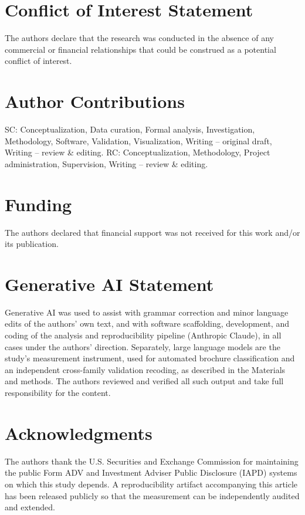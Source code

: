 \documentclass[utf8]{FrontiersinHarvard}
\begin{document}
\section*{Conflict of Interest Statement}
The authors declare that the research was conducted in the absence of any commercial or financial relationships that could be construed as a potential conflict of interest.

\section*{Author Contributions}
SC: Conceptualization, Data curation, Formal analysis, Investigation, Methodology, Software, Validation, Visualization, Writing -- original draft, Writing -- review \& editing. RC: Conceptualization, Methodology, Project administration, Supervision, Writing -- review \& editing.

\section*{Funding}
The authors declared that financial support was not received for this work and/or its publication.

\section*{Generative AI Statement}
Generative AI was used to assist with grammar correction and minor language edits of the authors' own text, and with software scaffolding, development, and coding of the analysis and reproducibility pipeline (Anthropic Claude), in all cases under the authors' direction. Separately, large language models are the study's measurement instrument, used for automated brochure classification and an independent cross-family validation recoding, as described in the Materials and methods. The authors reviewed and verified all such output and take full responsibility for the content.

\section*{Acknowledgments}
The authors thank the U.S. Securities and Exchange Commission for maintaining the public Form ADV and Investment Adviser Public Disclosure (IAPD) systems on which this study depends. A reproducibility artifact accompanying this article has been released publicly so that the measurement can be independently audited and extended.
\end{document}
